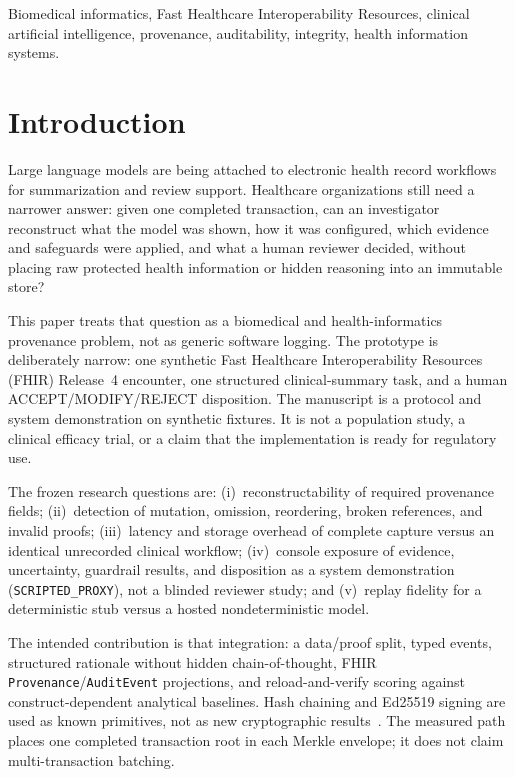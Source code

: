 \documentclass[journal]{IEEEtran}
\begin{document}
\begin{IEEEkeywords}
Biomedical informatics, Fast Healthcare Interoperability Resources,
clinical artificial intelligence, provenance, auditability, integrity,
health information systems.
\end{IEEEkeywords}

\section{Introduction}
\label{sec:intro}

Large language models are being attached to electronic health record workflows
for summarization and review support. Healthcare organizations still need a
narrower answer: given one completed transaction, can an investigator
reconstruct what the model was shown, how it was configured, which evidence
and safeguards were applied, and what a human reviewer decided, without
placing raw protected health information or hidden reasoning into an immutable
store?

This paper treats that question as a biomedical and health-informatics
provenance problem, not as generic software logging. The prototype is
deliberately narrow: one synthetic Fast Healthcare Interoperability Resources
(FHIR) Release~4 encounter, one structured clinical-summary task, and a human
ACCEPT/MODIFY/REJECT disposition. The manuscript is a protocol and system
demonstration on synthetic fixtures. It is not a population study, a clinical
efficacy trial, or a claim that the implementation is ready for regulatory
use.

The frozen research questions are: (i)~reconstructability of required
provenance fields; (ii)~detection of mutation, omission, reordering, broken
references, and invalid proofs; (iii)~latency and storage overhead of complete
capture versus an identical unrecorded clinical workflow; (iv)~console exposure
of evidence, uncertainty, guardrail results, and disposition as a system
demonstration (\texttt{SCRIPTED\_PROXY}), not a blinded reviewer study; and
(v)~replay fidelity for a deterministic stub versus a hosted nondeterministic
model.

The intended contribution is that integration: a data/proof split, typed
events, structured rationale without hidden chain-of-thought, FHIR
\texttt{Provenance}/\texttt{AuditEvent} projections, and reload-and-verify
scoring against construct-dependent analytical baselines. Hash chaining and
Ed25519 signing are used as known primitives, not as new cryptographic
results~\cite{haber1991timestamp,merkle1988signature,rfc8032}. The measured
path places one completed transaction root in each Merkle envelope; it does
not claim multi-transaction batching.
\end{document}
